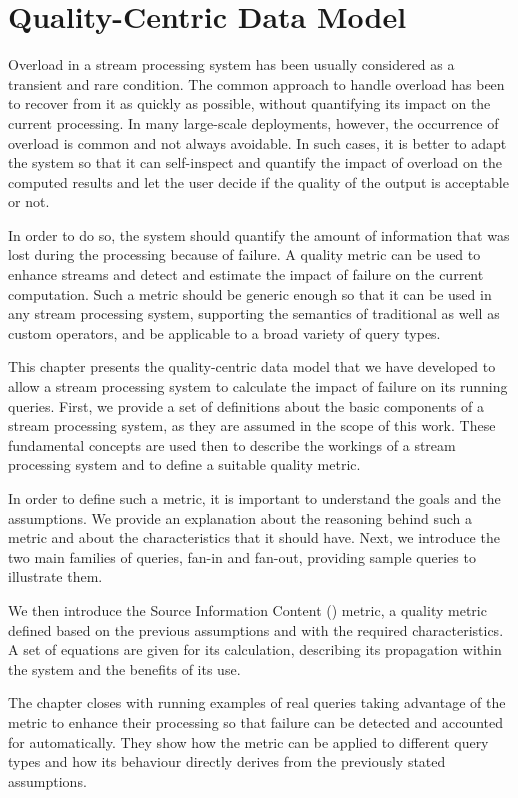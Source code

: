 \chapter{Quality-Centric Data Model}
\label{ch:data_model}

Overload in a stream processing system has been usually considered as a transient and rare condition. The
common approach to handle overload has been to recover from it as quickly as possible, without
quantifying its impact on the current processing. In many large-scale deployments, however, the
occurrence of overload is common and not always avoidable. In such cases, it is better to adapt the
system so that it can self-inspect and quantify the impact of overload on the computed results and let
the user decide if the quality of the output is acceptable or not. 

In order to do so, the system should quantify the amount of information that was lost during the
processing because of failure. A quality metric can be used to enhance streams and detect and
estimate the impact of failure on the current computation. Such a metric should be generic enough so
that it can be used in any stream processing system, supporting the semantics of traditional as well as
custom operators, and be applicable to a broad variety of query types.
 
This chapter presents the quality-centric data model that we have
developed to allow a stream processing system to calculate the impact of failure on its running queries.
First, we provide a set of definitions about the basic components of a stream processing
system, as they are assumed in the scope of this work. These fundamental concepts are used then to
describe the workings of a stream processing system and to define a suitable quality metric.

In order to define such a metric, it is important to understand the goals and the assumptions.
We provide an explanation about the reasoning behind such a metric and about the characteristics
that it should have. Next, we introduce the two main families of queries, fan-in and
fan-out, providing sample queries to illustrate them.

We then introduce the Source Information Content (\sic) metric, a quality metric
defined based on the previous assumptions and with the required characteristics. A set of equations are
given for its calculation, describing its propagation within the system and the benefits of its use.

The chapter closes with running examples of real queries taking advantage of the \sic metric to
enhance their processing so that failure can be detected and accounted for automatically. They show
how the \sic metric can be applied to different query types and how its behaviour directly derives from
the previously stated assumptions.

